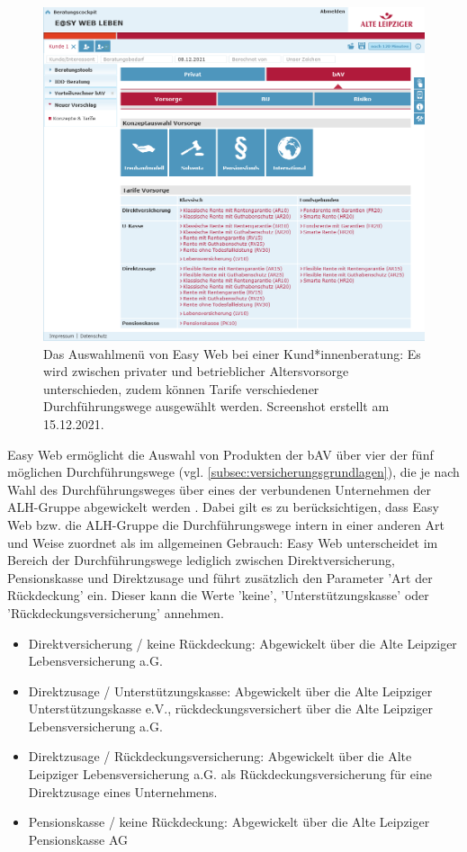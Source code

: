\begin{figure}[!htb]
\centering
\includegraphics[width=0.7\columnwidth]{images/Easy_Web_Leben_Auswahl.png}
\caption{Das Auswahlmenü von Easy Web bei einer Kund*innenberatung: Es wird zwischen privater und betrieblicher Altersvorsorge unterschieden, zudem können Tarife verschiedener Durchführungswege ausgewählt werden. Screenshot erstellt am 15.12.2021.}
\label{fig:easyWebAuswahl}
\end{figure}

Easy Web ermöglicht die Auswahl von Produkten der bAV über vier der fünf möglichen Durchführungswege (vgl. \autoref{subsec:versicherungsgrundlagen}), die je nach Wahl des Durchführungsweges über eines der verbundenen Unternehmen der ALH-Gruppe abgewickelt werden \cite{alh_bav}. Dabei gilt es zu berücksichtigen, dass Easy Web bzw. die ALH-Gruppe die Durchführungswege intern in einer anderen Art und Weise zuordnet als im allgemeinen Gebrauch: Easy Web unterscheidet im Bereich der Durchführungswege lediglich zwischen Direktversicherung, Pensionskasse und Direktzusage und führt zusätzlich den Parameter 'Art der Rückdeckung' ein. Dieser kann die Werte 'keine', 'Unterstützungskasse' oder 'Rückdeckungsversicherung' annehmen.
\begin{itemize}
\item Direktversicherung / keine Rückdeckung: Abgewickelt über die Alte Leipziger Lebensversicherung a.G.
\item Direktzusage / Unterstützungskasse: Abgewickelt über die Alte Leipziger Unterstützungskasse e.V., rückdeckungsversichert über die Alte Leipziger Lebensversicherung a.G.
\item Direktzusage / Rückdeckungsversicherung: Abgewickelt über die Alte Leipziger Lebensversicherung a.G. als Rückdeckungsversicherung für eine Direktzusage eines Unternehmens.
\item Pensionskasse / keine Rückdeckung: Abgewickelt über die Alte Leipziger Pensionskasse AG
\end{itemize} 

